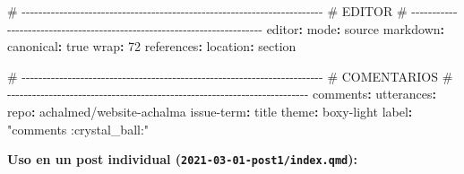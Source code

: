 \documentclass[
  doc,
  floatsintext,
  longtable,
  a4paper,
  nolmodern,
  notxfonts,
  notimes,
  12pt,
  colorlinks=true,linkcolor=blue,citecolor=blue,urlcolor=blue]{apa7}
\newenvironment{Shaded}{\begin{snugshade}}{\end{snugshade}}
\newcommand{\AttributeTok}[1]{\textcolor[rgb]{0.40,0.45,0.13}{#1}}
\newcommand{\CharTok}[1]{\textcolor[rgb]{0.13,0.47,0.30}{#1}}
\newcommand{\CommentTok}[1]{\textcolor[rgb]{0.37,0.37,0.37}{#1}}
\newcommand{\DecValTok}[1]{\textcolor[rgb]{0.68,0.00,0.00}{#1}}
\newcommand{\FunctionTok}[1]{\textcolor[rgb]{0.28,0.35,0.67}{#1}}
\newcommand{\KeywordTok}[1]{\textcolor[rgb]{0.00,0.23,0.31}{\textbf{#1}}}
\newcommand{\StringTok}[1]{\textcolor[rgb]{0.13,0.47,0.30}{#1}}
\begin{document}
\begin{Shaded}
\begin{Highlighting}[]
\CommentTok{\# {-}{-}{-}{-}{-}{-}{-}{-}{-}{-}{-}{-}{-}{-}{-}{-}{-}{-}{-}{-}{-}{-}{-}{-}{-}{-}{-}{-}{-}{-}{-}{-}{-}{-}{-}{-}{-}{-}{-}{-}{-}{-}{-}{-}{-}{-}{-}{-}{-}{-}{-}{-}{-}{-}{-}{-}{-}{-}{-}{-}{-}{-}{-}{-}{-}{-}{-}{-}{-}{-}{-}{-}}
\CommentTok{\# EDITOR}
\CommentTok{\# {-}{-}{-}{-}{-}{-}{-}{-}{-}{-}{-}{-}{-}{-}{-}{-}{-}{-}{-}{-}{-}{-}{-}{-}{-}{-}{-}{-}{-}{-}{-}{-}{-}{-}{-}{-}{-}{-}{-}{-}{-}{-}{-}{-}{-}{-}{-}{-}{-}{-}{-}{-}{-}{-}{-}{-}{-}{-}{-}{-}{-}{-}{-}{-}{-}{-}{-}{-}{-}{-}{-}{-}}
\FunctionTok{editor}\KeywordTok{:}
\AttributeTok{  }\FunctionTok{mode}\KeywordTok{:}\AttributeTok{ source}
\AttributeTok{  }\FunctionTok{markdown}\KeywordTok{:}
\AttributeTok{    }\FunctionTok{canonical}\KeywordTok{:}\AttributeTok{ }\CharTok{true}
\AttributeTok{    }\FunctionTok{wrap}\KeywordTok{:}\AttributeTok{ }\DecValTok{72}
\AttributeTok{    }\FunctionTok{references}\KeywordTok{:}
\AttributeTok{      }\FunctionTok{location}\KeywordTok{:}\AttributeTok{ section}

\CommentTok{\# {-}{-}{-}{-}{-}{-}{-}{-}{-}{-}{-}{-}{-}{-}{-}{-}{-}{-}{-}{-}{-}{-}{-}{-}{-}{-}{-}{-}{-}{-}{-}{-}{-}{-}{-}{-}{-}{-}{-}{-}{-}{-}{-}{-}{-}{-}{-}{-}{-}{-}{-}{-}{-}{-}{-}{-}{-}{-}{-}{-}{-}{-}{-}{-}{-}{-}{-}{-}{-}{-}{-}{-}}
\CommentTok{\# COMENTARIOS}
\CommentTok{\# {-}{-}{-}{-}{-}{-}{-}{-}{-}{-}{-}{-}{-}{-}{-}{-}{-}{-}{-}{-}{-}{-}{-}{-}{-}{-}{-}{-}{-}{-}{-}{-}{-}{-}{-}{-}{-}{-}{-}{-}{-}{-}{-}{-}{-}{-}{-}{-}{-}{-}{-}{-}{-}{-}{-}{-}{-}{-}{-}{-}{-}{-}{-}{-}{-}{-}{-}{-}{-}{-}{-}{-}}
\FunctionTok{comments}\KeywordTok{:}
\AttributeTok{  }\FunctionTok{utterances}\KeywordTok{:}
\AttributeTok{    }\FunctionTok{repo}\KeywordTok{:}\AttributeTok{ achalmed/website{-}achalma}
\AttributeTok{    }\FunctionTok{issue{-}term}\KeywordTok{:}\AttributeTok{ title}
\AttributeTok{    }\FunctionTok{theme}\KeywordTok{:}\AttributeTok{ boxy{-}light}
\AttributeTok{    }\FunctionTok{label}\KeywordTok{:}\AttributeTok{ }\StringTok{"comments :crystal\_ball:"}
\end{Highlighting}
\end{Shaded}

\textbf{Uso en un post individual
(\texttt{2021-03-01-post1/index.qmd}):}
\end{document}
